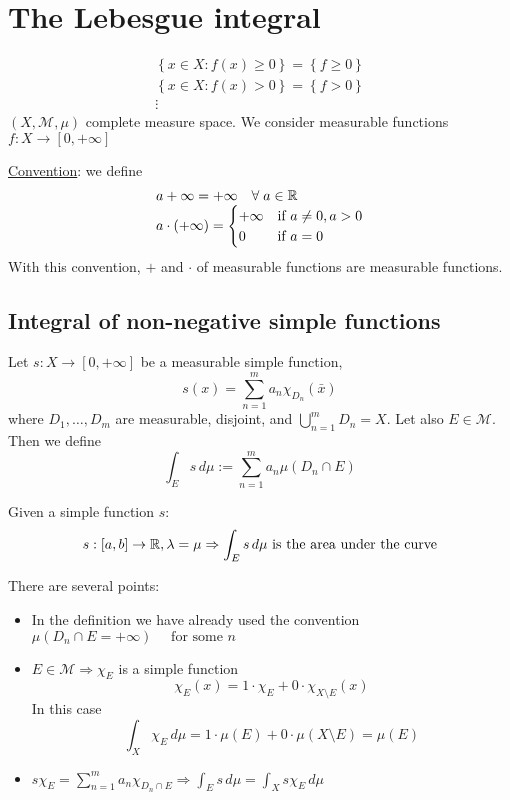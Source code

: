 
\section{The Lebesgue integral}
\begin{notation}
    \[
        \begin{array}{c}
            \left\{ x \in X : f(x) \geq 0 \right\} = \left\{ f \geq 0 \right\} \\
            \left\{ x \in X : f(x) > 0 \right\} = \left\{ f > 0 \right\}   \\
            \vdots
        \end{array}
        \]
    \((X, \mathcal{M}, \mu)\) complete measure space.
    We consider measurable functions \(f: X \to [0, +\infty]\)

    \underline{Convention}: we define 
    \[
        \begin{array}{l}
            a + \infty = +\infty \quad \forall \; a \in \mathbb{R} \\
            a \cdot (+\infty) = \begin{cases}
                +\infty & \mbox{if } a \neq 0, a > 0 \\
                0 & \mbox{if } a = 0
            \end{cases}        
        \end{array}
    \]
    With this convention, \(+ \) and \( \cdot\) of measurable functions are measurable functions.
\end{notation}
\subsection{Integral of non-negative simple functions}
\begin{definition}
    Let \(s: X \to [0, +\infty]\) be a measurable simple function, 
    \[
        s(x) = \sum_{n=1}^m a_n \chi_{D_n}(\bar{x})
    \]
    where \(D_1,\ldots,D_m\) are measurable, disjoint, and \(\bigcup_{n=1}^m D_n = X\). Let also \(E \in \mathcal{M}\). Then we define 
    \[
        \int_E s \, d\mu := \sum_{n=1}^m a_n \mu(D_n \cap E)
    \]
\end{definition}
\begin{remark}
    Given a simple function \(s\):
    \[s:[a,b] \to \mathbb{R}, \lambda = \mu \Rightarrow \int_E s \, d\mu \mbox{ is the area under the curve}\]
\end{remark}
\begin{remark}
    There are several points:
    \begin{itemize}
        \item In the definition we have already used the convention \(\mu(D_n \cap E = +\infty) \quad \mbox{ for some }n\)
        \item \(E \in \mathcal{M} \Rightarrow \chi_E\) is a simple function
        \[
            \chi_E(x) = 1 \cdot \chi_E + 0 \cdot \chi_{X\setminus E}(x)
        \] 
        In this case 
        \[
            \int_X \chi_E \, d\mu = 1\cdot \mu(E) + 0 \cdot \mu(X\setminus E) = \mu(E)
        \]
        \item \(s\chi_E = \sum_{n=1}^m a_n\chi_{D_n \cap E} \Rightarrow \int_E s\, d\mu = \int_X s\chi_E \, d\mu\)
    \end{itemize}
\end{remark}
